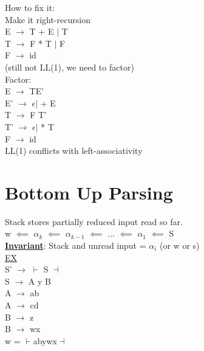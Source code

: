 \documentclass[12pt]{article}
\newcommand{\myt}[1]{\textbf{\underline{#1}}}
\begin{document}
	How to fix it:\\
	Make it right-recursion\\
	
	E $\rightarrow$ T + E $|$ T\\
	T $\rightarrow$ F * T $|$ F\\
	F $\rightarrow$ id\\
	(still not LL(1), we need to factor)\\
	
	Factor:\\
	E $\rightarrow$ TE'\\
	E' $\rightarrow$ $\epsilon | $ + E\\
	T $\rightarrow$ F T'\\
	T' $\rightarrow$ $\epsilon | $ * T\\
	F $\rightarrow$ id\\
	
	LL(1) conflicts with left-associativity\\
	
	\section*{Bottom Up Parsing}
	
	Stack stores partially reduced input read so far.\\
	w $\impliedby$ $\alpha_k$ $\impliedby$ $\alpha_{k-1}$ $\impliedby$ ... $\impliedby$ $\alpha_1$ $\impliedby$ S\\
	
	\myt{Invariant}: Stack and unread input = $\alpha_i$ (or w or s)\\
	
	\underline{EX}\\
	S' $\rightarrow$ $\vdash$ S $\dashv$\\
	S $\rightarrow$ A y B\\
	A $\rightarrow$ ab\\
	A $\rightarrow$ cd \\
	B $\rightarrow$ z \\
	B $\rightarrow$ wx\\
	
	w = $\vdash$abywx$\dashv$\\
	
\end{document}
